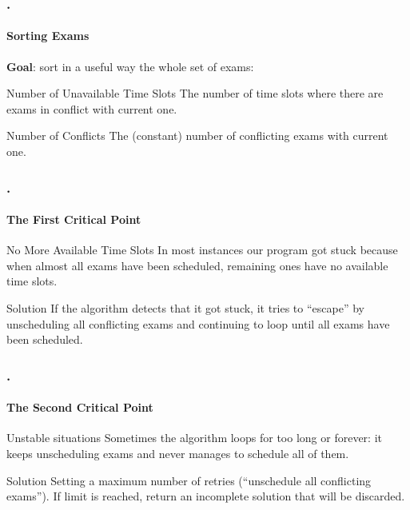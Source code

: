 \documentclass{beamer}
\begin{document}
	\begin{frame}
	   \frametitle{\thesection.\thesubsection \ \insertsubsection}
	   \framesubtitle{Sorting Exams}
	   
	\textbf{Goal}: \alert{sort} in a useful way the whole set of exams:
	\begin{block}{Number of Unavailable Time Slots}
		The number of time slots where there are exams in conflict with current one.
	\end{block}
	\begin{block}{Number of Conflicts}
		The (constant) number of conflicting exams with current one.
	\end{block}
	\end{frame}

\begin{frame}
\frametitle{\thesection.\thesubsection \ \insertsubsection}
\framesubtitle{The First Critical Point}
\begin{alertblock}{No More Available Time Slots}
	In most instances our program got stuck because when almost all exams have been scheduled, remaining ones have no available time slots.
\end{alertblock}
\begin{block}{Solution}
	 If the algorithm detects that it got stuck, it tries to ``escape'' by \alert{unscheduling all conflicting exams} and continuing to loop until all exams have been scheduled.
\end{block}

\end{frame}

\begin{frame}
\frametitle{\thesection.\thesubsection \ \insertsubsection}
\framesubtitle{The Second Critical Point}
\begin{alertblock}{Unstable situations}
	Sometimes the algorithm loops for too long or forever: it keeps unscheduling exams and never manages to schedule all of them.

\end{alertblock}
\begin{block}{Solution}
	Setting a maximum number of retries (``unschedule all conflicting exams''). If limit is reached, return an incomplete solution that will be discarded. %
\end{block}

\end{frame}
\end{document}
